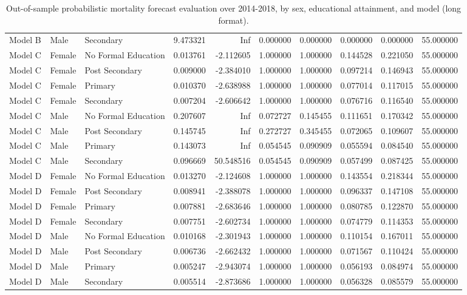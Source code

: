 \begin{table}[ht]
\begin{tabular}{lllrrrrrrr}
Model B & Male & Secondary & 9.473321 & Inf & 0.000000 & 0.000000 & 0.000000 & 0.000000 & 55.000000 \\
Model C & Female & No Formal Education & 0.013761 & -2.112605 & 1.000000 & 1.000000 & 0.144528 & 0.221050 & 55.000000 \\
Model C & Female & Post Secondary & 0.009000 & -2.384010 & 1.000000 & 1.000000 & 0.097214 & 0.146943 & 55.000000 \\
Model C & Female & Primary & 0.010370 & -2.638988 & 1.000000 & 1.000000 & 0.077014 & 0.117015 & 55.000000 \\
Model C & Female & Secondary & 0.007204 & -2.606642 & 1.000000 & 1.000000 & 0.076716 & 0.116540 & 55.000000 \\
Model C & Male & No Formal Education & 0.207607 & Inf & 0.072727 & 0.145455 & 0.111651 & 0.170342 & 55.000000 \\
Model C & Male & Post Secondary & 0.145745 & Inf & 0.272727 & 0.345455 & 0.072065 & 0.109607 & 55.000000 \\
Model C & Male & Primary & 0.143073 & Inf & 0.054545 & 0.090909 & 0.055594 & 0.084540 & 55.000000 \\
Model C & Male & Secondary & 0.096669 & 50.548516 & 0.054545 & 0.090909 & 0.057499 & 0.087425 & 55.000000 \\
Model D & Female & No Formal Education & 0.013270 & -2.124608 & 1.000000 & 1.000000 & 0.143554 & 0.218344 & 55.000000 \\
Model D & Female & Post Secondary & 0.008941 & -2.388078 & 1.000000 & 1.000000 & 0.096337 & 0.147108 & 55.000000 \\
Model D & Female & Primary & 0.007881 & -2.683646 & 1.000000 & 1.000000 & 0.080785 & 0.122870 & 55.000000 \\
Model D & Female & Secondary & 0.007751 & -2.602734 & 1.000000 & 1.000000 & 0.074779 & 0.114353 & 55.000000 \\
Model D & Male & No Formal Education & 0.010168 & -2.301943 & 1.000000 & 1.000000 & 0.110154 & 0.167011 & 55.000000 \\
Model D & Male & Post Secondary & 0.006736 & -2.662432 & 1.000000 & 1.000000 & 0.071567 & 0.110424 & 55.000000 \\
Model D & Male & Primary & 0.005247 & -2.943074 & 1.000000 & 1.000000 & 0.056193 & 0.084974 & 55.000000 \\
Model D & Male & Secondary & 0.005514 & -2.873686 & 1.000000 & 1.000000 & 0.056328 & 0.085579 & 55.000000 \\
\hline
\end{tabular}
\caption{Out-of-sample probabilistic mortality forecast evaluation over 2014-2018, by sex, educational attainment, and model (long format).}
\label{tab:new_table_e4_long}
\end{table}
